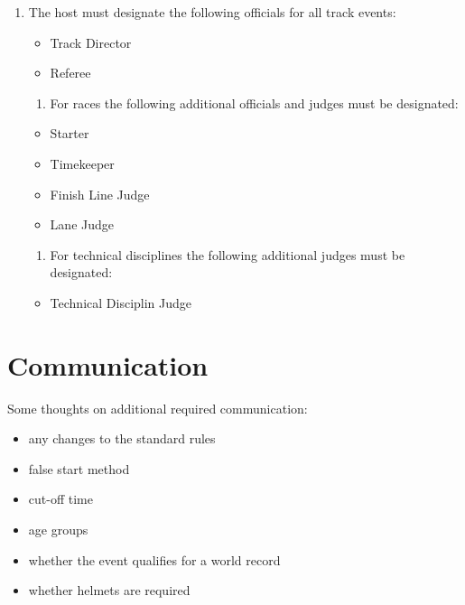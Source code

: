 \begin{enumerate}[leftmargin=1.5em,labelsep=*]
	\item The host must designate the following officials for all track events:
	\begin{itemize}
		\item Track Director
		\item Referee
	\end{itemize}
	\begin{enumerate}[label*=\arabic*,leftmargin=1.5em,labelsep=*]
		\item For races the following additional officials and judges must be designated:
	\end{enumerate}
	\begin{itemize}
		\item Starter
		\item Timekeeper
		\item Finish Line Judge
		\item Lane Judge
	\end{itemize}
	\begin{enumerate}[label*=\arabic*,leftmargin=1.5em,labelsep=*]
		\item For technical disciplines the following additional judges must be designated:
	\end{enumerate}
	\begin{itemize}
		\item Technical Disciplin Judge
	\end{itemize}
\end{enumerate}

\section{Communication}

\begin{comment2016}
Some thoughts on additional required communication:
\begin{itemize}
\item any changes to the standard rules
\item false start method
\item cut-off time
\item age groups
\item whether the event qualifies for a world record
\item whether helmets are required
\end{itemize}
\end{comment2016}

